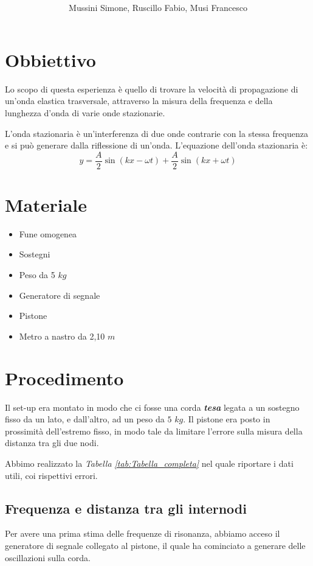 \documentclass[12pt, a4paper]{article}
\title{\textbf{\scalebox{1.4}{\text{{\Huge Onde Stazionarie}}}}}
\date{}
\author{\begin{small}Mussini Simone, Ruscillo Fabio, Musi Francesco\end{small}}
\begin{document}
\maketitle
\section{Obbiettivo}
Lo scopo di questa esperienza è quello di trovare la velocità di propagazione di un'onda elastica trasversale, attraverso la misura della frequenza e della lunghezza d'onda di varie onde stazionarie.\

L'onda stazionaria è un'interferenza di due onde contrarie con la stessa frequenza e si può generare dalla riflessione di un'onda.
L'equazione dell'onda stazionaria è:
\begin{equation*}
    y=\frac{A}{2}\sin{(kx - \omega t)} + \frac{A}{2}\sin{(kx + \omega t)}
\end{equation*}


\section{Materiale}
\begin{itemize}
\setlength\itemsep{0mm}
    \item Fune omogenea
    \item Sostegni
    \item Peso da 5 $kg$
    \item Generatore di segnale
    \item Pistone
    \item Metro a nastro da 2,10 $m$
\end{itemize}

\section{Procedimento}
Il set-up era montato in modo che ci fosse una corda \textbf{\textit{tesa}} legata a un sostegno fisso da un lato, e dall'altro, ad un peso da $5$ $kg$. Il pistone era posto in prossimità  dell'estremo fisso, in modo tale da limitare l'errore sulla misura della distanza tra gli due nodi.\ 

Abbimo realizzato la \textit{Tabella \ref{tab:Tabella_completa}} nel quale riportare i dati utili, coi rispettivi errori.\
  
\subsection{Frequenza e distanza tra gli internodi}
Per avere una prima stima delle frequenze di risonanza, abbiamo acceso il generatore di segnale collegato al pistone, il quale ha cominciato a generare delle oscillazioni sulla corda.\ 
\end{document}

